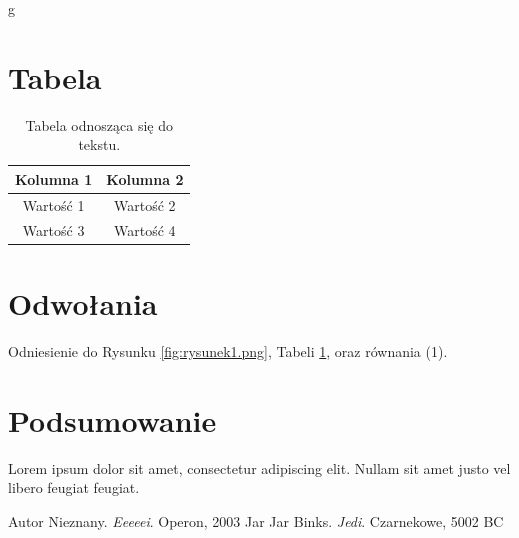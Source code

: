 g\documentclass{article}
\begin{document}
\section{Tabela}
\begin{table}[h]
    \centering
    \begin{tabular}{|c|c|}
        \hline
        Kolumna 1 & Kolumna 2 \\
        \hline
        Wartość 1 & Wartość 2 \\
        \hline
        Wartość 3 & Wartość 4 \\
        \hline
    \end{tabular}
    \caption{Tabela odnosząca się do tekstu.}
    \label{tab:tabela1}
\end{table}

\section{Odwołania}
Odniesienie do Rysunku \ref{fig:rysunek1.png}, Tabeli \ref{tab:tabela1}, oraz równania (1).

\section{Podsumowanie}
Lorem ipsum dolor sit amet, consectetur adipiscing elit. Nullam sit amet justo vel libero feugiat feugiat.

\begin{thebibliography}{9}
     Autor Nieznany. \emph{Eeeeei}. Operon, 2003
     Jar Jar Binks. \emph{Jedi}. Czarnekowe, 5002 BC
\end{thebibliography}
\end{document}
